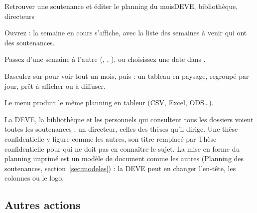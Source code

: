 \documentclass[11pt,a4paper]{article}
\begin{document}
\begin{procedure}{Retrouver une soutenance et éditer le planning du mois}{DEVE, bibliothèque, directeurs}
\begin{etapes}
  \item Ouvrez  : la semaine en cours
        s'affiche, avec la liste des semaines à venir qui ont des soutenances.
  \item Passez d'une semaine à l'autre (,
        , ), ou choisissez une
        date dans .
  \item Basculez sur  pour voir tout un mois, puis
         : un tableau en paysage,
        regroupé par jour, prêt à afficher ou à diffuser.
  \item Le menu  produit le
        même planning en tableur (CSV, Excel, ODS\ldots).
\end{etapes}
\end{procedure}



La DEVE, la bibliothèque et les personnels qui consultent tous les dossiers
voient toutes les soutenances ; un directeur, celles des thèses qu'il dirige.
Une thèse confidentielle y figure comme les autres, son titre remplacé par
\og Thèse confidentielle\fg{} pour qui ne doit pas en connaître le sujet. La mise en forme du planning imprimé est un modèle de
document comme les autres (\og Planning des soutenances\fg{},
section~\ref{sec:modeles}) : la DEVE peut en changer l'en-tête, les colonnes ou
le logo.

\subsection{Autres actions}
\end{document}
